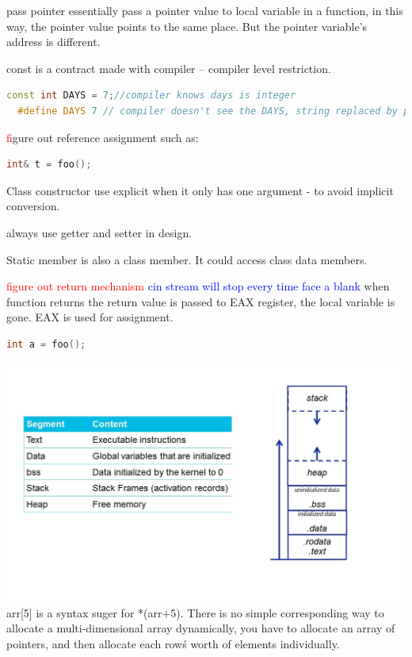 \documentclass[a4paper]{tufte-handout}
\begin{document}
pass pointer essentially pass a pointer value to local variable in a function, in this way, the pointer value points to the same place. But the pointer variable's address is different.

const is a contract made with compiler -- compiler level restriction.
\begin{lstlisting}[language=C++]
  const int DAYS = 7;//compiler knows days is integer
  #define DAYS 7 // compiler doesn't see the DAYS, string replaced by proprecessor.
\end{lstlisting}
\textcolor{red}figure out reference assignment such as:
\begin{lstlisting}[language=C++]
  int& t = foo();
\end{lstlisting}
Class constructor use explicit when it only has one argument - to avoid implicit conversion.

always use getter and setter in design.

Static member is also a class member. It could access class data members.

\textcolor{red}{figure out return mechanism}
\textcolor{blue}{cin stream will stop every time face a blank}
when function returns the return value is passed to EAX register, the local variable is gone.
EAX is used for assignment.
\begin{lstlisting}[language=C++]
  int a = foo();
\end{lstlisting}
\includegraphics[scale=0.65]{memory.jpg}
arr[5] is a syntax suger for *(arr+5).\newline
There is no simple corresponding way to allocate a multi-dimensional array dynamically, you have to allocate an array of pointers, and then allocate each row\'s worth of elements individually.
\end{document}
